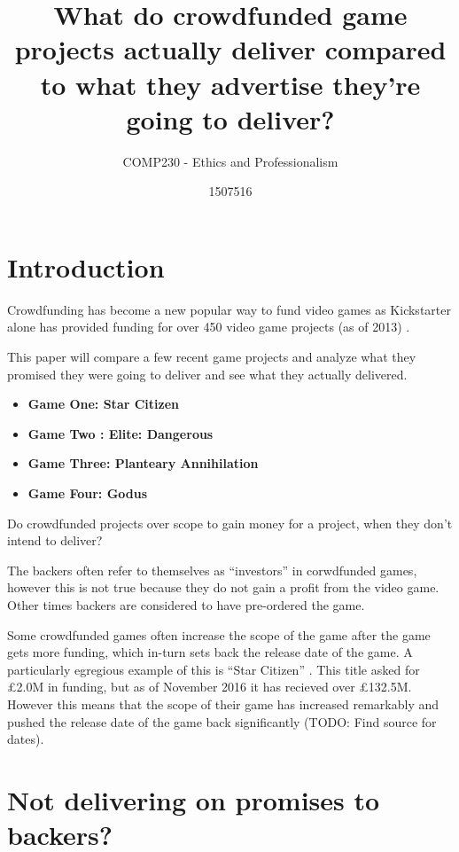 \documentclass{scrartcl}
\title{What do crowdfunded game projects actually deliver compared to what they advertise they're going to deliver?}
\subtitle{COMP230 - Ethics and Professionalism}
\author{1507516}
\begin{document}
\maketitle


\section{Introduction}
Crowdfunding has become a new popular way to fund video games as Kickstarter alone has provided funding for over 450 video game projects (as of 2013) \cite{Harris:2013}. %

This paper will compare a few recent game projects and analyze what they promised they were going to deliver and see what they actually delivered.
\begin{itemize}

\item  \textbf{Game One: Star Citizen}
\item  \textbf{Game Two : Elite: Dangerous}
\item  \textbf{Game Three: Planteary Annihilation}
\item  \textbf{Game Four: Godus}
\end{itemize}

Do crowdfunded projects over scope to gain money for a project, when they don't intend to deliver?

The backers often refer to themselves as ``investors'' in corwdfunded games, however this is not true because they do not gain a profit from the video game. Other times backers are considered to have pre-ordered the game.

Some crowdfunded games often increase the scope of the game after the game gets more funding, which in-turn sets back the release date of the game. A particularly egregious example of this is ``Star Citizen'' \cite{kickstarterStarCitizen}. This title asked for £2.0M in funding, but as of November 2016 it has recieved over £132.5M. However this means that the scope of their game has increased remarkably and pushed the release date of the game back significantly (TODO: Find source for dates).

\section{Not delivering on promises to backers?}
\end{document}
